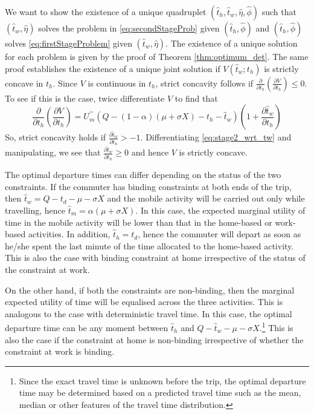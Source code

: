 \documentclass[12pt,a4paper,british]{article}
\makeatletter
\newenvironment{proof}[1][\proofname]{\par
    \normalfont\topsep6\p@\@plus6\p@\relax
    \trivlist
    \itemindent\parindent
    \item[\hskip\labelsep
          \scshape
      #1]\ignorespaces
  }{%
    \endtrivlist\@endpefalse
  }
\providecommand{\proofname}{Proof}
\makeatother
\begin{document}
\begin{proof}
We want to show the existence of a unique quadruplet $\left( \hat{t}_{h},\hat{t}_{w}, \hat{\eta},\hat{\phi}\right)$ such that $\left( \hat{t}_{w}, \hat{\eta}\right)$ solves the problem in \eqref{eq:secondStageProb} given $\left( \hat{t}_{h},\hat{\phi}\right)$ and $\left( \hat{t}_{h},\hat{\phi}\right)$ solves \eqref{eq:firstStageProblem} given $\left( \hat{t}_{w},\hat{\eta}\right)$. The existence of a unique solution for each problem is given by the proof of Theorem \ref{thm:optimum_det}. The same proof establishes the existence of a unique joint solution if $V\left(\hat{t}_{w};t_{h}\right)$ is strictly concave in $t_{h}$. Since $V$ is continuous in $t_{h}$, strict concavity follows if $\frac{\partial}{\partial t_{h}}\left(\frac{\partial V}{\partial t_{h}}\right) \leq 0$. To see if this is the case, twice differentiate $V$ to find that%
\begin{equation*}
\frac{\partial}{\partial t_{h}}\left(\frac{\partial V}{\partial t_{h}}\right) = U_{m}^{\prime\prime} \left(Q - \left(1 - \alpha\right) \left(\mu + \sigma X\right) - t_{h} - \hat{t}_{w} \right) \left( 1 + \frac{\partial\hat{t}_{w}}{\partial t_{h}}\right)
\end{equation*}
So, strict concavity holds if $\frac{\partial\hat{t}_{w}}{\partial t_{h}} > -1$. Differentiating \eqref{eq:stage2_wrt_tw} and manipulating, we see that  $\frac{\partial\hat{t}_{w}} {\partial t_{h}} \geq 0$ and hence $V$ is strictly concave. 
\end{proof}


The optimal departure times can differ depending on the status of the two constraints. If the commuter has binding constraints at both ends of the trip, then $\hat{t}_{w}=Q-t_{d}-\mu-\sigma X$ and the mobile activity will be carried out only while travelling, hence $\hat{t}_{m}=\alpha\left(\mu+\sigma X\right)$. In this case, the expected marginal utility of time in the mobile activity will be lower than that in the home-based or work-based activities. In addition, $\hat{t}_{h}=t_{d}$, hence the commuter will depart as soon as he/she spent the last minute of the time allocated to the home-based activity. This is also the case with binding constraint at home irrespective of the status of the constraint at work.

On the other hand, if both the constraints are non-binding, then the marginal expected utility of time will be equalised across the three activities. This is analogous to the case with deterministic travel time. In this case, the optimal departure time can be any moment between $\hat{t}_{h}$ and $Q-\hat{t}_{w}-\mu-\sigma X$.\footnote{Since the exact travel time is unknown before the trip, the optimal departure time may be determined based on a predicted travel time such as the mean, median or other features of the travel time distribution.} This is also the case if the constraint at home is non-binding irrespective of whether the constraint at work is binding. 
\end{document}
